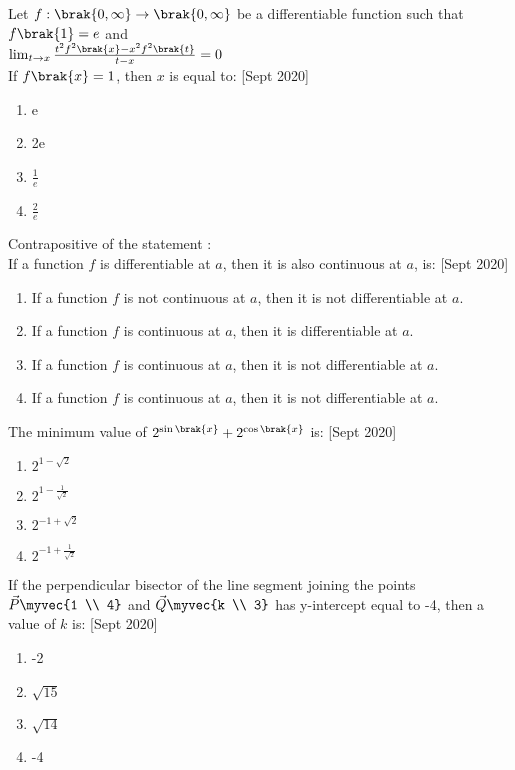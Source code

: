 	\item
	Let $f: \brak{0, \infty} \to \brak{0, \infty}
$ be a differentiable function such that $f\brak{1} = e$ and \\
	$\lim_{t \to x} \frac{t^{2}f^{2}\brak{x}-x^{2}f^{2}\brak{t}}{t-x} = 0$ \\
	If $f\brak{x} = 1$, then $x$ is equal to:
	\hfill [Sept 2020]
		\begin{enumerate}
			\item e
			\item 2e
			\item $\frac{1}{e}$
			\item $\frac{2}{e}$
		\end{enumerate}
	\item
	Contrapositive of the statement : \\
	If a function $f$ is differentiable at $a$, then it is also continuous at $a$, is:
	\hfill [Sept 2020]
		\begin{enumerate}
			\item If a function $f$ is not continuous at $a$, then it is not differentiable at $a$.
			\item If a function $f$ is continuous at $a$, then it is differentiable at $a$.
			\item If a function $f$ is continuous at $a$, then it is not differentiable at $a$.
			\item If a function $f$ is continuous at $a$, then it is not differentiable at $a$.
		\end{enumerate}
	\item
	The minimum value of $2^{\sin\brak{x}}+2^{\cos\brak{x}}$ is:
	\hfill [Sept 2020]
		\begin{enumerate}
			\item $2^{1-\sqrt{2}}$
			\item $2^{1 - \frac{1}{\sqrt{2}}}$
			\item $2^{-1+\sqrt{2}}$
			\item $2^{-1 + \frac{1}{\sqrt{2}}}$
		\end{enumerate}
	\item
	If the perpendicular bisector of the line segment joining the points $\vec{P}\myvec{1 \\ 4}$ and $\vec{Q}\myvec{k \\ 3}$ has y-intercept equal to -4, then a value of $k$ is:
	\hfill [Sept 2020]
		\begin{enumerate}
			\item -2
			\item $\sqrt{15}$
			\item $\sqrt{14}$
			\item -4
		\end{enumerate}
